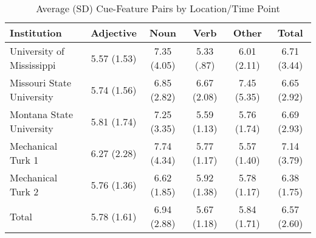 \documentclass[english,,man]{apa6}
\theoremstyle{definition}
\theoremstyle{definition}
\theoremstyle{definition}
\theoremstyle{remark}
\begin{document}
\begin{table}[tbp]
\begin{center}
\begin{threeparttable}
\caption{\label{tab:feature-table}Average (SD) Cue-Feature Pairs by Location/Time Point}
\begin{tabular}{lccccc}
\toprule
Institution & Adjective & Noun & Verb & Other & Total\\
\midrule
University of Mississippi & 5.57 (1.53) & 7.35 (4.05) & 5.33 (.87) & 6.01 (2.11) & 6.71 (3.44)\\
Missouri State University & 5.74 (1.56) & 6.85 (2.82) & 6.67 (2.08) & 7.45 (5.35) & 6.65 (2.92)\\
Montana State University & 5.81 (1.74) & 7.25 (3.35) & 5.59 (1.13) & 5.76 (1.74) & 6.69 (2.93)\\
Mechanical Turk 1 & 6.27 (2.28) & 7.74 (4.34) & 5.77 (1.17) & 5.57 (1.40) & 7.14 (3.79)\\
Mechanical Turk 2 & 5.76 (1.36) & 6.62 (1.85) & 5.92 (1.38) & 5.78 (1.17) & 6.38 (1.75)\\
Total & 5.78 (1.61) & 6.94 (2.88) & 5.67 (1.18) & 5.84 (1.71) & 6.57 (2.60)\\
\bottomrule
\end{tabular}
\end{threeparttable}
\end{center}
\end{table}
\end{document}
